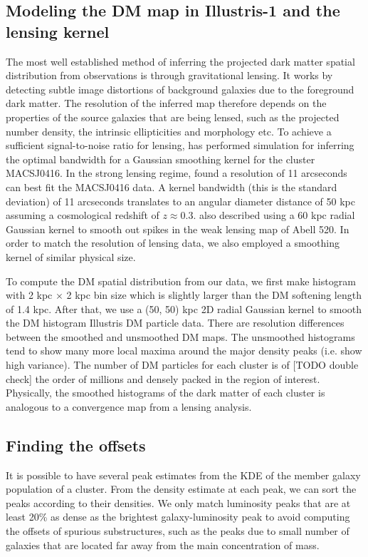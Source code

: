 \subsection{Modeling the DM map in Illustris-1 and the lensing kernel}
The most well established method of inferring the projected dark matter spatial 
distribution from observations is through gravitational lensing.
It works by detecting subtle image distortions of background galaxies due to
the foreground dark matter. The resolution of the inferred map therefore 
depends on the properties of the source galaxies that are being lensed, 
such as the projected number density, the intrinsic ellipticities and morphology etc.
To achieve a sufficient signal-to-noise ratio for lensing, 
\cite{Hoag2016} has performed simulation for inferring the optimal bandwidth
for a Gaussian smoothing kernel for the cluster MACSJ0416. 
In the strong lensing regime, \cite{Hoag2016} found a resolution of 11 arcseconds
can best fit the MACSJ0416 data. A kernel bandwidth (this is the standard deviation) 
of 11 arcseconds translates to an angular diameter distance of 50 
kpc assuming a cosmological redshift of $z \approx 0.3$. 
\cite{Clowe2012} also described using a 60 kpc radial Gaussian kernel to smooth out spikes
in the weak lensing map of Abell 520. In order to match the resolution of lensing data,
we also employed a smoothing kernel of similar physical size.  

To compute the DM spatial distribution from our data, we first make histogram with 2 kpc
$\times$ 2 kpc bin size which is slightly larger than the DM softening length of 1.4 kpc. 
After that, we use a (50, 50) kpc 2D radial Gaussian kernel 
to smooth the DM histogram Illustris DM
particle data. 
There are resolution differences between the smoothed and unsmoothed DM
maps. The unsmoothed histograms tend to show many more local maxima around the major
density peaks (i.e. show high variance). 
The number of DM particles for each cluster is of 
[TODO double check] the order of millions and densely packed in the region of
interest. 
Physically, the smoothed histograms of the dark matter of each cluster 
is analogous to a convergence map from a lensing analysis. 


\subsection{Finding the offsets} \label{subsec:offsets}
It is possible to have several peak estimates from the KDE of the member galaxy 
population of a cluster. 
From the density estimate at each peak, we can sort 
the peaks according to their densities. We only match luminosity 
peaks that are at 
least 20\% as dense as the brightest galaxy-luminosity peak to avoid 
computing the offsets of spurious substructures, such as the peaks due to 
small number of galaxies that are located far away from the main concentration of mass.

